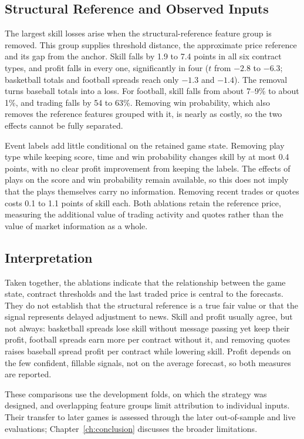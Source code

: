 \documentclass[12pt,a4paper,oneside]{report}
\begin{document}
\subsection{Structural Reference and Observed Inputs}
The largest skill losses arise when the structural-reference feature group is
removed. This group supplies threshold distance, the approximate price reference
and its gap from the anchor. Skill falls by 1.9 to 7.4 points in all six contract
types, and profit falls in every one, significantly in four ($t$ from $-2.8$ to
$-6.3$; basketball totals and football spreads reach only $-1.3$ and $-1.4$). The
removal turns baseball totals into a loss. For football, skill falls from about
7--9\% to about 1\%, and trading falls by 54 to 63\%. Removing win probability, which also
removes the reference features grouped with it, is nearly as costly, so the two effects cannot
be fully separated.

Event labels add little conditional on the retained game state. Removing play
type while keeping score, time and win probability changes skill by at most
0.4 points, with no clear profit improvement from keeping the labels. The
effects of plays on the score and win probability remain available, so this
does not imply that the plays themselves carry no information. Removing
recent trades or quotes costs 0.1 to 1.1 points of skill each. Both ablations
retain the reference price, measuring the additional value of trading
activity and quotes rather than the value of market information as a whole.

\subsection{Interpretation}
Taken together, the ablations indicate that the relationship between the game
state, contract thresholds and the last traded price is central to the
forecasts. They do not establish that the structural reference is a true fair
value or that the signal represents delayed adjustment to news. Skill and
profit usually agree, but not always: basketball spreads lose skill without message
passing yet keep their profit, football spreads earn more per contract without it,
and removing quotes raises baseball spread profit per contract while lowering skill. Profit depends on the few confident, fillable
signals, not on the average forecast, so both measures are reported.

These comparisons use the development folds, on which the strategy was
designed, and overlapping feature groups limit attribution to individual
inputs. Their transfer to later games is assessed through the later out-of-sample and
live evaluations; Chapter~\ref{ch:conclusion} discusses the broader limitations.
\end{document}

